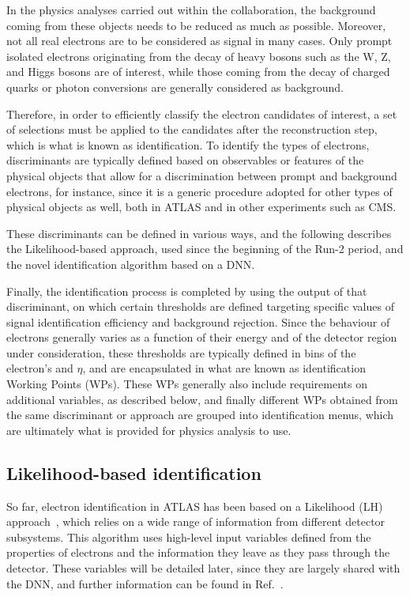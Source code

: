 In the physics analyses carried out within the collaboration, the background coming from these objects needs to be reduced as much as possible. Moreover, not all real electrons are to be considered as signal in many cases. Only prompt isolated electrons originating from the decay of heavy bosons such as the W, Z, and Higgs bosons are of interest, while those coming from the decay of charged quarks or photon conversions are generally considered as background.

Therefore, in order to efficiently classify the electron candidates of interest, a set of selections must be applied to the candidates after the reconstruction step, which is what is known as identification. To identify the types of electrons, discriminants are typically defined based on observables or features of the physical objects that allow for a discrimination between prompt and background electrons, for instance, since it is a generic procedure adopted for other types of physical objects as well, both in ATLAS and in other experiments such as CMS.

These discriminants can be defined in various ways, and the following describes the Likelihood-based approach, used since the beginning of the Run-2 period, and the novel identification algorithm based on a DNN.

Finally, the identification process is completed by using the output of that discriminant, on which certain thresholds are defined targeting specific values of signal identification efficiency and background rejection. Since the behaviour of electrons generally varies as a function of their energy and of the detector region under consideration, these thresholds are typically defined in bins of the electron’s \et and $\eta$, and are encapsulated in what are known as identification Working Points (WPs). These WPs generally also include requirements on additional variables, as described below, and finally different WPs obtained from the same discriminant or approach are grouped into identification menus, which are ultimately what is provided for physics analysis to use.

\subsection{Likelihood-based identification}

So far, electron identification in ATLAS has been based on a Likelihood (LH) approach~\cite{Aad:2684552,Aaboud:2657964}, which relies on a wide range of information from different detector subsystems. This algorithm uses high-level input variables defined from the properties of electrons and the information they leave as they pass through the detector. These variables will be detailed later, since they are largely shared with the DNN, and further information can be found in Ref.~\cite{Aaboud:2657964}.

